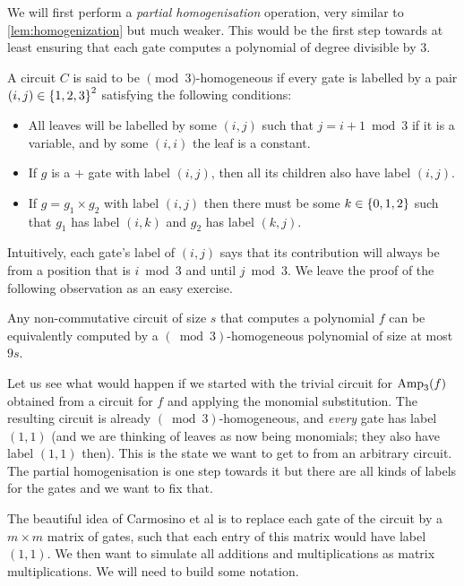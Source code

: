 We will first perform a \emph{partial homogenisation} operation, very similar to \autoref{lem:homogenization} but much weaker. This would be the first step towards at least ensuring that each gate computes a polynomial of degree divisible by $3$. 

\begin{definition} A circuit $C$ is said to be $\pmod{3}$-homogeneous if every gate is labelled by a pair $(i,j) \in \left\{1,2,3\right\}^2$ satisfying the following conditions: 
  \begin{itemize}
  \item All leaves will be labelled by some $(i,j)$ such that $j = i+1 \bmod 3$ if it is a variable, and by some $(i,i)$ the leaf is a constant.
  \item If $g$ is a $+$ gate with label $(i,j)$, then all its children also have label $(i,j)$.
  \item If $g = g_1 \times g_2$ with label $(i,j)$ then there must be some $k \in \left\{0,1,2\right\}$ such that $g_1$ has label $(i,k)$ and $g_2$ has label $(k,j)$. \qedhere
  \end{itemize}
\end{definition}

Intuitively, each gate's label of $(i,j)$ says that its contribution will always be from a position that is $i \bmod 3$ and until $j\bmod 3$. We leave the proof of the following observation as an easy exercise. 

\begin{observation}
  Any non-commutative circuit of size $s$ that computes a polynomial $f$ can be equivalently computed by a $(\bmod{3})$-homogeneous polynomial of size at most $9s$.  
\end{observation}

Let us see what would happen if we started with the trivial circuit for $\operatorname{Amp}_3(f)$ obtained from a circuit for $f$ and applying the monomial substitution. The resulting circuit is already $(\bmod{3})$-homogeneous, and \emph{every} gate has label $(1,1)$ (and we are thinking of leaves as now being monomials; they also have label $(1,1)$ then). This is the state we want to get to from an arbitrary circuit. The partial homogenisation is one step towards it but there are all kinds of labels for the gates and we want to fix that.

The beautiful idea of Carmosino et al \cite{CILM18} is to replace each gate of the circuit by a $m\times m$ matrix of gates, such that each entry of this matrix would have label $(1,1)$. We then want to simulate all additions and multiplications as matrix multiplications. We will need to build some notation. 

